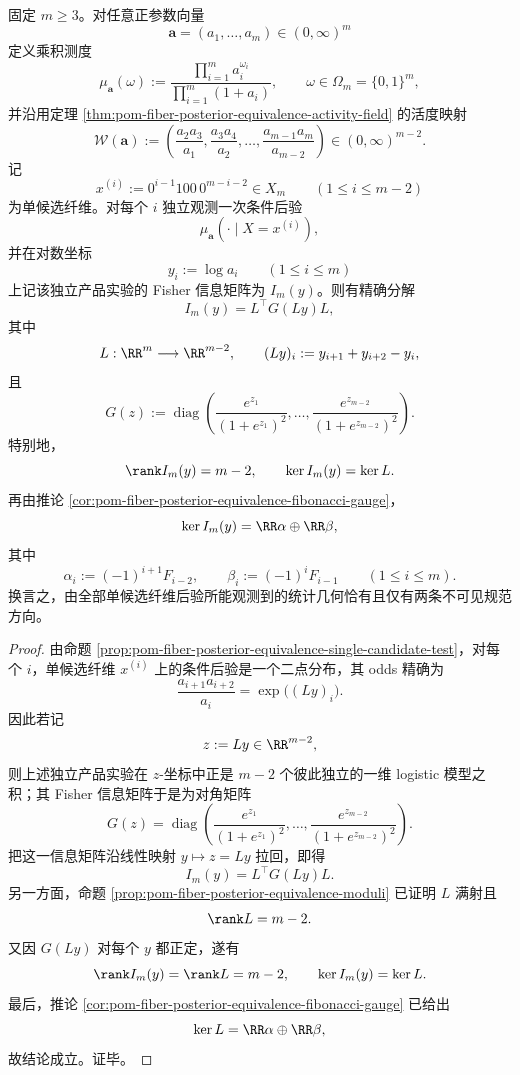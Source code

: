 \begin{theorem}\label{thm:conclusion-fiber-posterior-two-dimensional-fisher-null}
固定 \(m\ge 3\)。对任意正参数向量
\[
\boldsymbol a=(a_1,\dots,a_m)\in(0,\infty)^m
\]
定义乘积测度
\[
\mu_{\boldsymbol a}(\omega)
:=
\frac{\prod_{i=1}^{m}a_i^{\omega_i}}{\prod_{i=1}^{m}(1+a_i)},
\qquad
\omega\in\Omega_m=\{0,1\}^m,
\]
并沿用定理 \ref{thm:pom-fiber-posterior-equivalence-activity-field} 的活度映射
\[
\mathcal W(\boldsymbol a)
:=
\left(
\frac{a_2a_3}{a_1},
\frac{a_3a_4}{a_2},
\dots,
\frac{a_{m-1}a_m}{a_{m-2}}
\right)\in(0,\infty)^{m-2}.
\]
记
\[
x^{(i)}:=0^{i-1}100\,0^{m-i-2}\in X_m
\qquad (1\le i\le m-2)
\]
为单候选纤维。对每个 \(i\) 独立观测一次条件后验
\[
\mu_{\boldsymbol a}(\cdot\mid X=x^{(i)}),
\]
并在对数坐标
\[
y_i:=\log a_i
\qquad (1\le i\le m)
\]
上记该独立产品实验的 Fisher 信息矩阵为 \(I_m(y)\)。则有精确分解
\[
I_m(y)=L^\top G(Ly)L,
\]
其中
\[
L:\RR^m\longrightarrow \RR^{m-2},
\qquad
(Ly)_i:=y_{i+1}+y_{i+2}-y_i,
\]
且
\[
G(z)
:=
\operatorname{diag}\!\left(
\frac{e^{z_1}}{(1+e^{z_1})^2},
\dots,
\frac{e^{z_{m-2}}}{(1+e^{z_{m-2}})^2}
\right).
\]
特别地，
\[
\rank I_m(y)=m-2,
\qquad
\ker I_m(y)=\ker L.
\]
再由推论 \ref{cor:pom-fiber-posterior-equivalence-fibonacci-gauge}，
\[
\ker I_m(y)=\RR\alpha\oplus \RR\beta,
\]
其中
\[
\alpha_i:=(-1)^{i+1}F_{i-2},
\qquad
\beta_i:=(-1)^iF_{i-1}
\qquad (1\le i\le m).
\]
换言之，由全部单候选纤维后验所能观测到的统计几何恰有且仅有两条不可见规范方向。
\end{theorem}
\begin{proof}
由命题 \ref{prop:pom-fiber-posterior-equivalence-single-candidate-test}，对每个 \(i\)，单候选纤维 \(x^{(i)}\) 上的条件后验是一个二点分布，其 odds 精确为
\[
\frac{a_{i+1}a_{i+2}}{a_i}
=
\exp\!\bigl((Ly)_i\bigr).
\]
因此若记
\[
z:=Ly\in\RR^{m-2},
\]
则上述独立产品实验在 \(z\)-坐标中正是 \(m-2\) 个彼此独立的一维 logistic 模型之积；其 Fisher 信息矩阵于是为对角矩阵
\[
G(z)
=
\operatorname{diag}\!\left(
\frac{e^{z_1}}{(1+e^{z_1})^2},
\dots,
\frac{e^{z_{m-2}}}{(1+e^{z_{m-2}})^2}
\right).
\]
把这一信息矩阵沿线性映射 \(y\mapsto z=Ly\) 拉回，即得
\[
I_m(y)=L^\top G(Ly)L.
\]
另一方面，命题 \ref{prop:pom-fiber-posterior-equivalence-moduli} 已证明 \(L\) 满射且
\[
\rank L=m-2.
\]
又因 \(G(Ly)\) 对每个 \(y\) 都正定，遂有
\[
\rank I_m(y)=\rank L=m-2,
\qquad
\ker I_m(y)=\ker L.
\]
最后，推论 \ref{cor:pom-fiber-posterior-equivalence-fibonacci-gauge} 已给出
\[
\ker L=\RR\alpha\oplus \RR\beta,
\]
故结论成立。证毕。
\end{proof}

